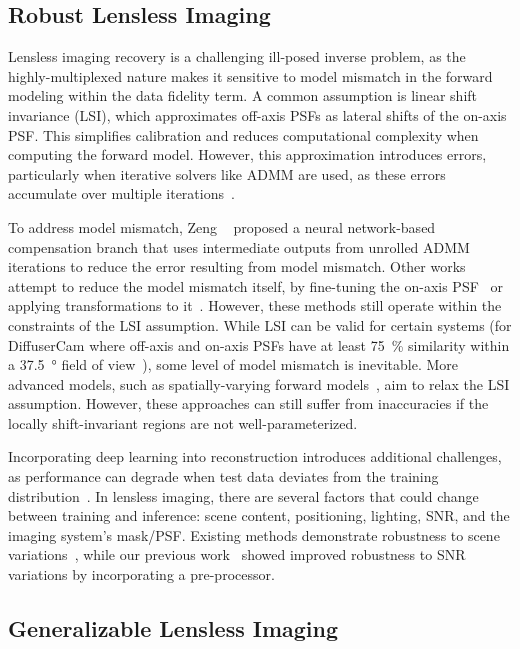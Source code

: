 \subsection{Robust Lensless Imaging}

\noindent Lensless imaging recovery is a challenging ill-posed inverse problem, as the highly-multiplexed nature makes it sensitive to model mismatch in the forward modeling within the data fidelity term.
A common assumption is linear shift invariance (LSI), which approximates off-axis PSFs as lateral shifts of the on-axis PSF.
This simplifies calibration and reduces computational complexity when computing the forward model.
However, this approximation introduces errors, particularly when iterative solvers like ADMM are used, as these errors accumulate over multiple iterations~\cite{9546648}.

To address model mismatch, Zeng \etal~\cite{9546648} proposed a neural network-based compensation branch that uses intermediate outputs from unrolled ADMM iterations to reduce the error resulting from model mismatch.
Other works attempt to reduce the model mismatch itself, \eg by fine-tuning the on-axis PSF~\cite{9239993,Kingshott:22} or applying transformations to it~\cite{Li:23}.
However, these methods still operate within the constraints of the LSI assumption.
While LSI can be valid for certain systems (\eg for DiffuserCam where off-axis and on-axis PSFs have at least \SI{75}{\percent} similarity within a \SI{37.5}{\degree} field of view~\cite{Antipa:18}),
some level of model mismatch is inevitable.
More advanced models, such as spatially-varying forward models~\cite{Yanny:22,cai2024phocolens}, aim to relax the LSI assumption.
However, these approaches can still suffer from inaccuracies if the locally shift-invariant regions are not well-parameterized.

Incorporating deep learning into reconstruction introduces additional challenges, as performance can degrade when test data deviates from the training distribution~\cite{9782500}.
In lensless imaging, there are several factors that could change between training and inference:
\eg scene content, positioning, lighting, SNR, and the imaging system's mask/PSF.
Existing methods demonstrate robustness to scene variations~\cite{Monakhova:19,9239993,Lee:23},
while our previous work~\cite{Perron2023} showed improved robustness to SNR variations by incorporating a pre-processor.

\subsection{Generalizable Lensless Imaging}

